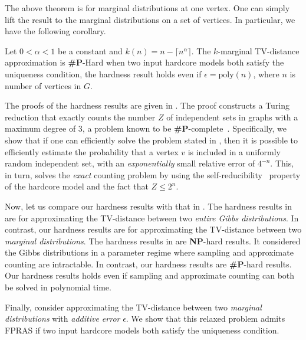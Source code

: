 The above theorem is for marginal distributions at one vertex. One can simply lift the result to the marginal distributions on a set of vertices.
In particular, we have the following corollary.

\begin{corollary}\label{thm:many-vertex}
Let $0 < \alpha < 1$ be a constant and $k(n) = n - \lceil n^\alpha \rceil$. The $k$-marginal TV-distance approximation is \textbf{\#P}-Hard when two input hardcore models both satisfy the uniqueness condition, the hardness result holds even if $\epsilon = \mathrm{poly}(n)$, where  $n$ is number of vertices in $G$.      
\end{corollary}

The proofs of the hardness results are given in .
The proof constructs a Turing reduction that exactly counts the number $Z$ of independent sets in graphs with a maximum degree of 3, a problem known to be \textbf{\#P}-complete~\cite{DyerG00}. Specifically, we show that if one can efficiently solve the problem stated in , then it is possible to efficiently estimate the probability that a vertex $v$ is included in a uniformly random independent set, with an \emph{exponentially} small relative error of $4^{-n}$. This, in turn, solves the \emph{exact} counting problem by using the self-reducibility~\cite{JVV86} property of the hardcore model and the fact that $Z \leq 2^n$.

Now, let us compare our hardness results with that in \cite{BGMMPV24ICLR}. The hardness results in \cite{BGMMPV24ICLR} are for approximating the TV-distance between two \emph{entire Gibbs distributions}. In contrast, our hardness results are for approximating the TV-distance between two \emph{marginal distributions}. The hardness results in \cite{BGMMPV24ICLR} are \textbf{NP}-hard results. It considered the Gibbs distributions in a parameter regime where sampling and approximate counting are intractable. In contrast, our hardness results are \textbf{\#P}-hard results. Our hardness results holds even if sampling and approximate counting can both be solved in polynomial time.


Finally, consider approximating the TV-distance between two \emph{marginal distributions} with \emph{additive error} $\epsilon$. We show that this relaxed problem admits FPRAS if two input hardcore models both satisfy the uniqueness condition. 


